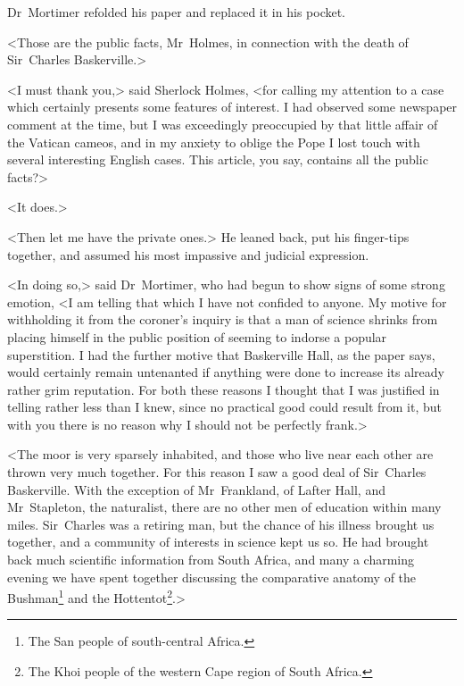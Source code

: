 \divider

\begin{letter}
	\clearpage
\end{letter}

Dr~Mortimer refolded his paper and replaced it in his pocket.

<Those are the public facts, Mr~Holmes, in connection with the death of Sir~Charles Baskerville.>

<I must thank you,> said Sherlock Holmes, <for calling my attention to a case which certainly presents some features of interest. I had observed some newspaper comment at the time, but I was exceedingly preoccupied by that little affair of the Vatican cameos, and in my anxiety to oblige the Pope I lost touch with several interesting English cases. This article, you say, contains all the public facts?>

<It does.>



<Then let me have the private ones.> He leaned back, put his finger-tips together, and assumed his most impassive and judicial expression.

<In doing so,> said Dr~Mortimer, who had begun to show signs of some strong emotion, <I am telling that which I have not confided to anyone. My motive for withholding it from the coroner's inquiry is that a man of science shrinks from placing himself in the public position of seeming to indorse a popular superstition. I had the further motive that Baskerville Hall, as the paper says, would certainly remain untenanted if anything were done to increase its already rather grim reputation. For both these reasons I thought that I was justified in telling rather less than I knew, since no practical good could result from it, but with you there is no reason why I should not be perfectly frank.>

\begin{withfootnotes}
<The moor is very sparsely inhabited, and those who live near each other are thrown very much together. For this reason I saw a good deal of Sir~Charles Baskerville. With the exception of Mr~Frankland, of Lafter Hall, and Mr~Stapleton, the naturalist, there are no other men of education within many miles. Sir~Charles was a retiring man, but the chance of his illness brought us together, and a community of interests in science kept us so. He had brought back much scientific information from South Africa, and many a charming evening we have spent together discussing the comparative anatomy of the Bushman\footnote{The San people of south-central Africa.} and the Hottentot\footnote{The Khoi people of the western Cape region of South Africa.}.>
\end{withfootnotes}

